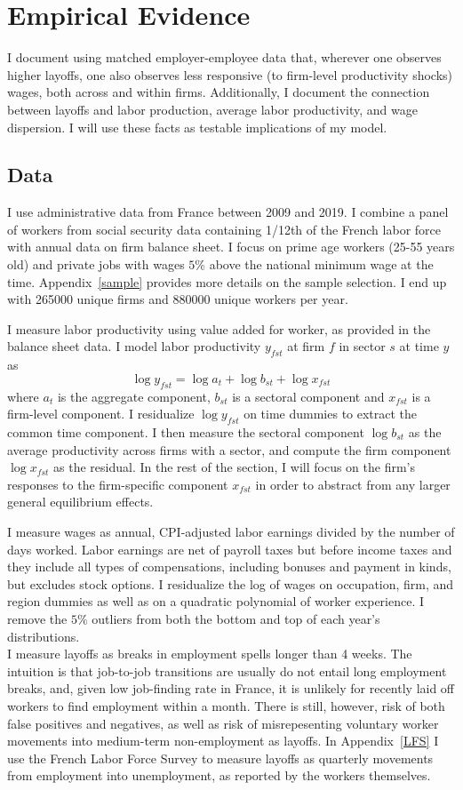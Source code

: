 \section{Empirical Evidence}
I document using matched employer-employee data that, wherever one observes higher layoffs, one also observes less responsive (to firm-level productivity shocks) wages, both across and within firms. Additionally, I document the connection between layoffs and labor production, average labor productivity, and wage dispersion. I will use these facts as testable implications of my model.

\subsection*{Data}
I use administrative data from France between 2009 and 2019. I combine a panel of workers from social security data containing 1/12th of the French labor force with annual data on firm balance sheet.  I focus on prime age workers (25-55 years old) and private jobs with wages $5\%$ above the national minimum wage at the time. Appendix~\ref{sample} provides more details on the sample selection. I end up with 265000 unique firms and 880000  unique workers per year.

I measure labor productivity using value added for worker, as provided in the balance sheet data. I model labor productivity $y_{fst}$ at firm $f$ in sector $s$ at time $y$ as 
\[ \log y_{fst} = \log a_t + \log b_{st}+ \log x_{fst}\]
where $a_t$ is the aggregate component, $b_{st}$ is a sectoral component and $x_{fst}$ is a firm-level component. I residualize $\log y_{fst}$ on time dummies to extract the common time component. I then measure the sectoral component $\log b_{st}$ as the average productivity across firms with a sector, and compute the firm component $\log x_{fst}$ as the residual. In the rest of the section, I will focus on the firm's responses to the firm-specific component $x_{fst}$ in order to abstract from any larger general equilibrium effects.

I measure wages as annual, CPI-adjusted labor earnings divided by the number of days worked. Labor earnings are net of payroll taxes but before income
taxes and they include all types of compensations, including bonuses and payment in kinds, but excludes stock options. I residualize the log of wages on occupation, firm, and region dummies as well as on a quadratic polynomial of worker experience. I remove the $5\%$ outliers from both the bottom and top of each year's distributions. \\
I measure layoffs as breaks in employment spells longer than 4 weeks. The intuition is that job-to-job transitions are usually do not entail long employment breaks, and, given low job-finding rate in France, it is unlikely for recently laid off workers to find employment within a month. There is still, however, risk of both false positives and negatives, as well as risk of misrepesenting voluntary worker movements into medium-term non-employment as layoffs. In Appendix~\ref{LFS} I use the French Labor Force Survey to measure layoffs as quarterly movements from employment into unemployment, as reported by the workers themselves.
